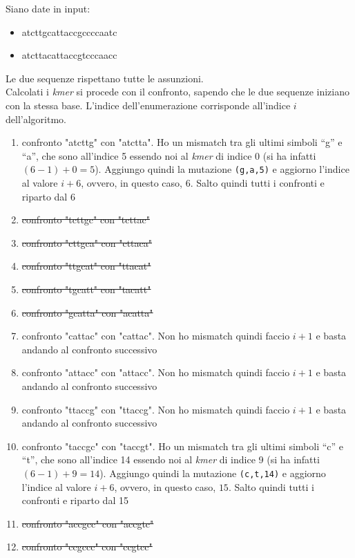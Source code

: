 \documentclass[a4paper,12pt, oneside]{book}
\begin{document}
\begin{esempio}
  Siano date in input:
  \begin{itemize}
    \item atcttgcattaccgccccaatc
    \item atcttacattaccgtcccaacc
  \end{itemize}
  Le due sequenze rispettano tutte le assunzioni.\\
  Calcolati i \textit{kmer} si procede con il confronto, sapendo che le due
  sequenze iniziano con la stessa base. L'indice dell'enumerazione corrisponde
  all'indice $i$ dell'algoritmo.
  \begin{enumerate}[start=0]
    \item confronto "atcttg" con "atctta". Ho un mismatch tra gli ultimi simboli
    ``g'' e ``a'', che sono all'indice 5 essendo noi al \textit{kmer} di indice
    0 (si ha infatti $(6-1)+0=5$). Aggiungo quindi la mutazione \texttt{(g,a,5)}
    e aggiorno l'indice al valore $i+6$, ovvero, in questo caso, $6$. Salto
    quindi tutti i confronti e riparto dal 6
    \item \sout{confronto "tcttgc" con "tcttac"}
    \item \sout{confronto "cttgca" con "cttaca"}
    \item \sout{confronto "ttgcat" con "ttacat"}
    \item \sout{confronto "tgcatt" con "tacatt"}
    \item \sout{confronto "gcatta" con "acatta"}
    \item confronto "cattac" con "cattac". Non ho mismatch quindi faccio $i+1$ e
    basta andando al confronto successivo
    \item confronto "attacc" con "attacc". Non ho mismatch quindi faccio $i+1$ e
    basta andando al confronto successivo
    \item confronto "ttaccg" con "ttaccg". Non ho mismatch quindi faccio $i+1$ e
    basta andando al confronto successivo
    \item confronto "taccgc" con "taccgt". Ho un mismatch tra gli ultimi simboli
    ``c'' e ``t'', che sono all'indice 14 essendo noi al \textit{kmer} di indice
    9 (si ha infatti $(6-1)+9=14$). Aggiungo quindi la mutazione
    \texttt{(c,t,14)} 
    e aggiorno l'indice al valore $i+6$, ovvero, in questo caso, $15$. Salto
    quindi tutti i confronti e riparto dal 15
    \item \sout{confronto "accgcc" con "accgtc"}
    \item \sout{confronto "ccgccc" con "ccgtcc"}

\end{enumerate}
\end{esempio}
\end{document}
